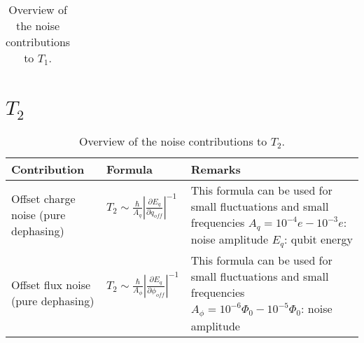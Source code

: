 \documentclass[]{article}
\begin{document}
\begin{table}[h]
\begin{tabular}{|p{2cm}|p{5.5cm}|p{7.5cm}|}
\end{tabular} 
\caption{Overview of the noise contributions to $T_1$.}
\label{tab:T_1}
\end{table}


\section{$T_2$}
\begin{table}[h]
\centering
\begin{tabular}{|p{2cm}|p{5.5cm}|p{7.5cm}|}
	\hline 
Contribution	& Formula & Remarks \\ 
	\hline \hline 
Offset charge noise (pure dephasing)& $T_2 \sim \frac{\hbar}{A_q} \left| \frac{\partial E_q}{\partial q_{off}} \right|^{-1} $~\cite{koch2007} & This formula can be used for small fluctuations and small frequencies \newline
 $A_q = 10^{-4}e - 10^{-3}e$: noise amplitude \newline
 $E_q$: qubit energy \\
\hline 
Offset flux noise (pure dephasing)& $T_2 \sim \frac{\hbar}{A_{\phi}} \left| \frac{\partial E_q}{\partial \phi_{off}} \right|^{-1} $~\cite{koch2007} & This formula can be used for small fluctuations and small frequencies \newline
 $A_{\phi}= 10^{-6}\Phi_0 - 10^{-5}\Phi_0$: noise amplitude \\
\hline 
\end{tabular} 
\caption{Overview of the noise contributions to $T_2$.}
\label{tab:T_2}
\end{table}




\end{document}
